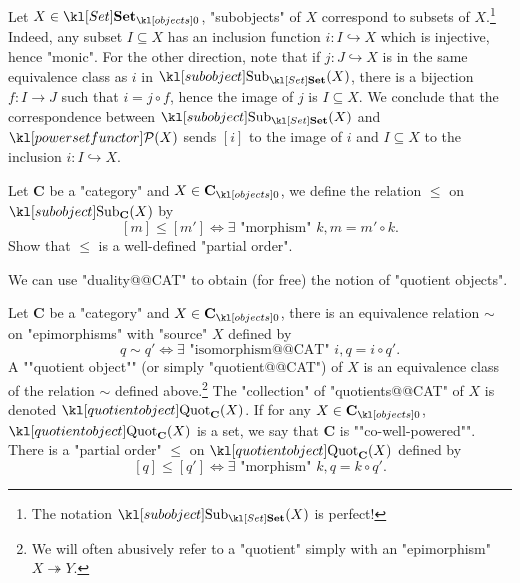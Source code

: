 \documentclass[main.tex]{subfiles}
\begin{document}
\begin{exmp}[$\catSet$]
	Let $X \in \obj{\catSet}$, "subobjects" of $X$ correspond to subsets of $X$.\footnote{The notation $\Sub_{\catSet}(X)$ is perfect!} Indeed, any subset $I \subseteq X$ has an inclusion function $i: I \hookrightarrow X$ which is injective, hence "monic". For the other direction, note that if $j: J \hookrightarrow X$ is in the same equivalence class as $i$ in $\Sub_{\catSet}(X)$, there is a bijection $f: I \rightarrow J$ such that $i = j \circ f$, hence the image of $j$ is $I\subseteq X$. We conclude that the correspondence between $\Sub_{\catSet}(X)$ and $\mPcov(X)$ sends $[i]$ to the image of $i$ and $I\subseteq X$ to the inclusion $i: I \hookrightarrow X$.
\end{exmp}
\begin{exer}\label{exer:duality:posetsubobj}
	Let $\mathbf{C}$ be a "category" and $X \in \obj{\mathbf{C}}$, we define the relation $\leq$ on $\Sub_{\mathbf{C}}(X)$ by 
	\[[m] \leq [m'] \Leftrightarrow \exists \text{ "morphism" } k,  m = m' \circ k.\]
	Show that $\leq$ is a well-defined "partial order".
\end{exer}
We can use "duality@@CAT" to obtain (for free) the notion of "quotient objects".
\begin{defn}[Quotients]
	Let $\mathbf{C}$ be a "category" and $X \in \obj{\mathbf{C}}$, there is an equivalence relation $\sim$ on "epimorphisms" with "source" $X$ defined by \[q \sim q' \Leftrightarrow \exists \text{ "isomorphism@@CAT" } i,  q = i \circ q'.\]
	\AP A ""quotient object"" (or simply "quotient@@CAT") of $X$ is an equivalence class of the relation $\sim$ defined above.\footnote{We will often abusively refer to a "quotient" simply with an "epimorphism" $X \twoheadrightarrow Y$.} The "collection" of "quotients@@CAT" of $X$ is denoted $\Quot_{\mathbf{C}}(X)$. \AP If for any $X \in \obj{\mathbf{C}}$, $\Quot_{\mathbf{C}}(X)$ is a set, we say that $\mathbf{C}$ is ""co-well-powered"". There is a "partial order" $\leq$ on $\Quot_{\mathbf{C}}(X)$ defined by 
	\[[q] \leq [q'] \Leftrightarrow \exists \text{ "morphism" } k,  q = k \circ q'.\]
\end{defn}
\end{document}

